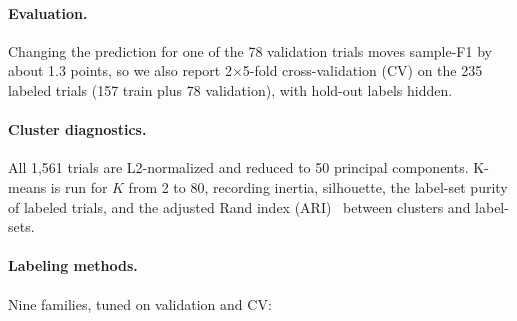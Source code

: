 \paragraph{Evaluation.}
Changing the prediction for one of the 78 validation trials moves sample-F1 by about 1.3 points, so we also report 2$\times$5-fold cross-validation (CV) on the 235 labeled trials (157 train plus 78 validation), with hold-out labels hidden.

\paragraph{Cluster diagnostics.}
All 1,561 trials are L2-normalized and reduced to 50 principal components.
K-means is run for $K$ from 2 to 80, recording inertia, silhouette, the label-set purity of labeled trials, and the adjusted Rand index (ARI)~\cite{hubert1985comparing} between clusters and label-sets.

\paragraph{Labeling methods.}
Nine families, tuned on validation and CV:

